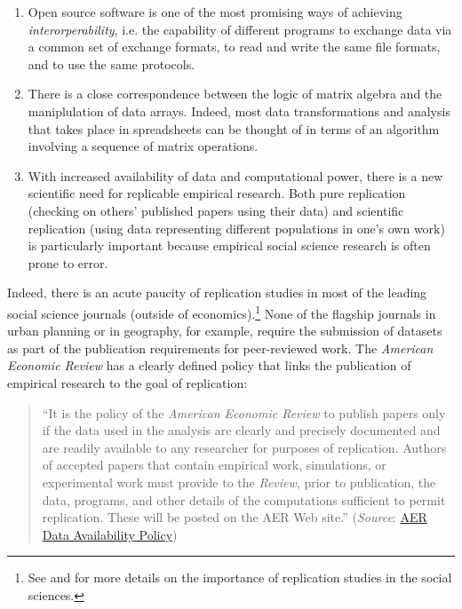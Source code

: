 \begin{enumerate}
\item Open source software is one of the most promising ways of achieving \emph{interorperability}, i.e. the capability of different programs to exchange data via a common set of exchange formats, to read and write the same file formats, and to use the same protocols.
\item There is a close correspondence between the logic of matrix algebra and the maniplulation of data arrays. Indeed, most data transformations and analysis that takes place in spreadsheets can be thought of in terms of an algorithm involving a sequence of matrix operations.
\item With increased availability of data and computational power, there is a new scientific need for replicable empirical research. Both pure replication (checking on others' published papers using their data) and scientific replication (using data representing different populations in one's own work) is particularly important because empirical social science research is often prone to error. 
\end{enumerate}

Indeed, there is an acute paucity of replication studies in most of the leading social science journals (outside of economics).\footnote{See \citet{Hamermesh2007} and \citet{Burman2010a} for more details on the importance of replication studies in the social sciences.} None of the flagship journals in urban planning or in geography, for example, require the submission of datasets as part of the publication requirements for peer-reviewed work. The \emph{American Economic Review} has a clearly defined policy that links the publication of empirical research to the goal of replication:

\small
\begin{quote}
``It is the policy of the \emph{American Economic Review} to publish papers only if the data used in the analysis are clearly and precisely documented and are readily available to any researcher for purposes of replication. Authors of accepted papers that contain empirical work, simulations, or experimental work must provide to the \emph{Review}, prior to publication, the data, programs, and other details of the computations sufficient to permit replication. These will be posted on the AER Web site.'' (\emph{Source}: \href{http://www.aeaweb.org/aer/data.php}{AER Data Availability Policy})
\end{quote}
\normalsize


